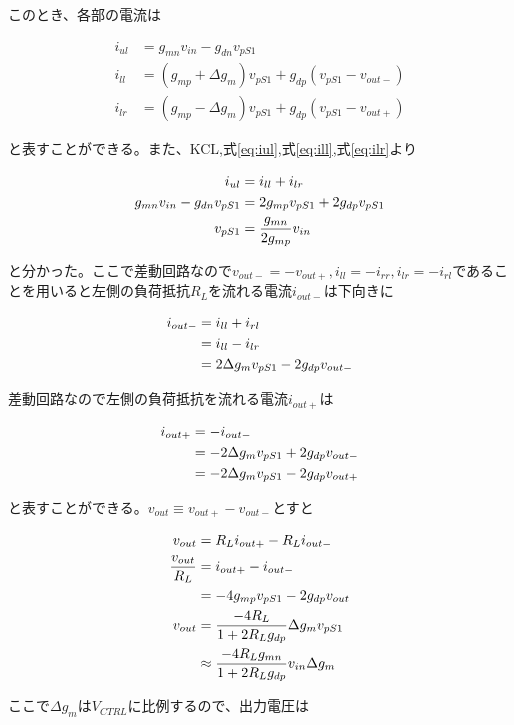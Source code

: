 \documentclass[twocolumn]{jsarticle}
\begin{document}
このとき、各部の電流は

\begin{align}
    i_{ul}&=g_{mn}v_{in}-g_{dn}v_{pS1} \label{eq:iul}\\
    i_{ll}&=(g_{mp}+\Delta g_{m})v_{pS1}+g_{dp}(v_{pS1}-v_{out-}) \label{eq:ill}\\
    i_{lr}&=(g_{mp}-\Delta g_{m})v_{pS1}+g_{dp}(v_{pS1}-v_{out+}) \label{eq:ilr}
\end{align}

と表すことができる。また、KCL,式\eqref{eq:iul},式\eqref{eq:ill},式\eqref{eq:ilr}より

\begin{align}
    i_{ul}&=i_{ll}+i_{lr} \notag\\
    g_{mn}v_{in}-g_{dn}v_{pS1}&=2g_{mp}v_{pS1}+2g_{dp}v_{pS1} \notag\\
    v_{pS1}&=\frac{g_{mn}}{2g_{mp}}v_{in} \label{eq:vps}
\end{align}

と分かった。ここで差動回路なので$v_{out-}=-v_{out+},i_{ll}=-i_{rr},i_{lr}=-i_{rl}$であることを用いると左側の負荷抵抗$R_{L}$を流れる電流$i_{out-}$は下向きに

\begin{align}
    i_{out-}&=i_{ll}+i_{rl} \notag\\
    &=i_{ll}-i_{lr} \notag\\
    &=2\Delta g_{m}v_{pS1}-2g_{dp}v_{out-}
\end{align}

差動回路なので左側の負荷抵抗を流れる電流$i_{out+}$は

\begin{align}
    i_{out+}&=-i_{out-} \notag\\
    &=-2\Delta g_{m}v_{pS1}+2g_{dp}v_{out-} \notag\\
    &=-2\Delta g_{m}v_{pS1}-2g_{dp}v_{out+}
\end{align}

と表すことができる。$v_{out}\equiv v_{out+}-v_{out-}$とすと

\begin{align}
    v_{out}&=R_{L}i_{out+}-R_{L}i_{out-} \notag\\
    \frac{v_{out}}{R_L}&=i_{out+}-i_{out-} \notag\\
    &=-4g_{mp}v_{pS1}-2g_{dp}v_{out} \notag\\
    v_{out}&=\frac{-4R_{L}}{1+2R_{L}g_{dp}}\Delta g_{m}v_{pS1} \notag\\
    &\approx \frac{-4R_{L}g_{mn}}{1+2R_{L}g_{dp}}v_{in}\Delta g_{m}
\end{align}

ここで$\Delta g_{m}$は$V_{CTRL}$に比例するので、出力電圧は
\end{document}
